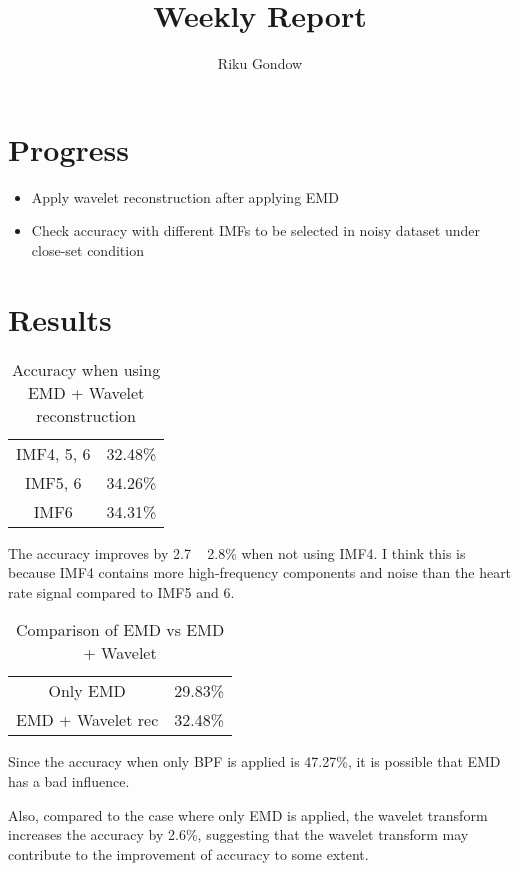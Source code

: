 \documentclass[dvipdfmx]{article}
\begin{document}
\title{Weekly Report}
\author{Riku Gondow}
\maketitle
\section{Progress}
\begin{itemize}
    \item Apply wavelet reconstruction after applying EMD 
    \item Check accuracy with different IMFs to be selected in noisy dataset under close-set condition
\end{itemize}
\section{Results}

\begin{table}[H]
    \caption{Accuracy when using EMD + Wavelet reconstruction}
    \centering
    \begin{tabular}{c|c}
    \hline
    IMF4, 5, 6 & 32.48\% \\
    IMF5, 6 & 34.26\% \\
    IMF6 & 34.31\% \\
    \hline
    \end{tabular}
\end{table}

The accuracy improves by 2.7 ~ 2.8\% when not using IMF4. I think this is because IMF4 contains more high-frequency components and noise than the heart rate signal compared to IMF5 and 6.

\begin{table}[H]
    \caption{Comparison of EMD vs EMD + Wavelet}
    \centering
    \begin{tabular}{c|c}
    \hline
    Only EMD & 29.83\% \\
    EMD + Wavelet rec & 32.48\% \\
    \hline
    \end{tabular}
\end{table}


Since the accuracy when only BPF is applied is 47.27\%, it is possible that EMD has a bad influence. 

Also, compared to the case where only EMD is applied, the wavelet transform increases the accuracy by 2.6\%, suggesting that the wavelet transform may contribute to the improvement of accuracy to some extent.
\end{document}
